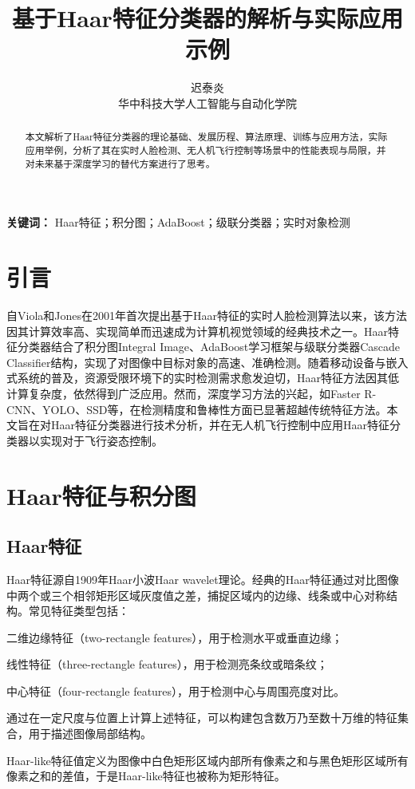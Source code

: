 \documentclass[UTF8]{ctexart}
\title{基于Haar特征分类器的解析与实际应用示例}
\author{迟泰炎 \\ 华中科技大学人工智能与自动化学院}
\date{}
\begin{document}
\maketitle

\begin{abstract}
本文解析了Haar特征分类器的理论基础、发展历程、算法原理、训练与应用方法，实际应用举例，分析了其在实时人脸检测、无人机飞行控制等场景中的性能表现与局限，并对未来基于深度学习的替代方案进行了思考。
\end{abstract}

\noindent\textbf{关键词：} Haar特征；积分图；AdaBoost；级联分类器；实时对象检测

\section{引言}
自Viola和Jones在2001年首次提出基于Haar特征的实时人脸检测算法以来，该方法因其计算效率高、实现简单而迅速成为计算机视觉领域的经典技术之一\cite{viola2001}。Haar特征分类器结合了积分图Integral Image、AdaBoost学习框架与级联分类器Cascade Classifier结构，实现了对图像中目标对象的高速、准确检测。随着移动设备与嵌入式系统的普及，资源受限环境下的实时检测需求愈发迫切，Haar特征方法因其低计算复杂度，依然得到广泛应用。然而，深度学习方法的兴起，如Faster R-CNN、YOLO、SSD等，在检测精度和鲁棒性方面已显著超越传统特征方法\cite{dalal2005}。本文旨在对Haar特征分类器进行技术分析，并在无人机飞行控制中应用Haar特征分类器以实现对于飞行姿态控制。

\section{Haar特征与积分图}
\subsection{Haar特征}
Haar特征源自1909年Haar小波Haar wavelet理论。经典的Haar特征通过对比图像中两个或三个相邻矩形区域灰度值之差，捕捉区域内的边缘、线条或中心对称结构\cite{lienhart2002}。常见特征类型包括：

二维边缘特征（two-rectangle features），用于检测水平或垂直边缘；

线性特征（three-rectangle features），用于检测亮条纹或暗条纹；

中心特征（four-rectangle features），用于检测中心与周围亮度对比。

通过在一定尺度与位置上计算上述特征，可以构建包含数万乃至数十万维的特征集合，用于描述图像局部结构。

Haar-like特征值定义为图像中白色矩形区域内部所有像素之和与黑色矩形区域所有像素之和的差值，于是Haar-like特征也被称为矩形特征\cite{chen2011}。
\end{document}
